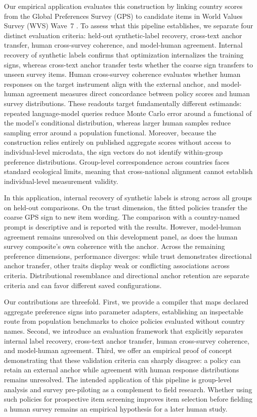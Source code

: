 Our empirical application evaluates this construction by linking country scores from the Global Preferences Survey (GPS) \cite{falk2018} to candidate items in World Values Survey (WVS) Wave~7 \cite{wvs2022}. To assess what this pipeline establishes, we separate four distinct evaluation criteria: held-out synthetic-label recovery, cross-text anchor transfer, human cross-survey coherence, and model-human agreement. Internal recovery of synthetic labels confirms that optimization internalizes the training signs, whereas cross-text anchor transfer tests whether the coarse sign transfers to unseen survey items. Human cross-survey coherence evaluates whether human responses on the target instrument align with the external anchor, and model-human agreement measures direct concordance between policy scores and human survey distributions. These readouts target fundamentally different estimands: repeated language-model queries reduce Monte Carlo error around a functional of the model's conditional distribution, whereas larger human samples reduce sampling error around a population functional. Moreover, because the construction relies entirely on published aggregate scores without access to individual-level microdata, the sign vectors do not identify within-group preference distributions. Group-level correspondence across countries faces standard ecological limits, meaning that cross-national alignment cannot establish individual-level measurement validity.

In this application, internal recovery of synthetic labels is strong across all groups on held-out comparisons. On the trust dimension, the fitted policies transfer the coarse GPS sign to new item wording. The comparison with a country-named prompt is descriptive and is reported with the results. However, model-human agreement remains unresolved on this development panel, as does the human survey composite's own coherence with the anchor. Across the remaining preference dimensions, performance diverges: while trust demonstrates directional anchor transfer, other traits display weak or conflicting associations across criteria. Distributional resemblance and directional anchor retention are separate criteria and can favor different saved configurations.

Our contributions are threefold. First, we provide a compiler that maps declared aggregate preference signs into parameter adapters, establishing an inspectable route from population benchmarks to choice policies evaluated without country names. Second, we introduce an evaluation framework that explicitly separates internal label recovery, cross-text anchor transfer, human cross-survey coherence, and model-human agreement. Third, we offer an empirical proof of concept demonstrating that these validation criteria can sharply disagree: a policy can retain an external anchor while agreement with human response distributions remains unresolved. The intended application of this pipeline is group-level analysis and survey pre-piloting as a complement to field research. Whether using such policies for prospective item screening improves item selection before fielding a human survey remains an empirical hypothesis for a later human study.
